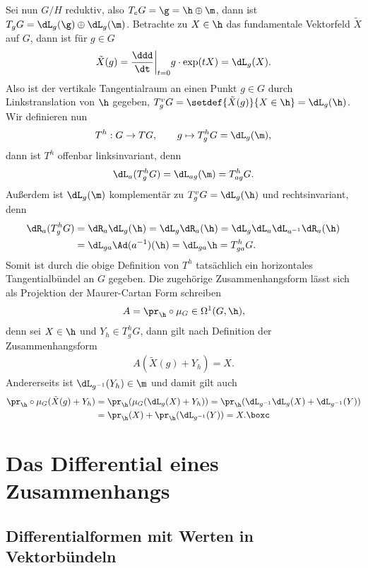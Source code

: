 \documentclass[%
	paper=a5,%
	fleqn,%
	DIV=18,%
	BCOR=0mm,
	fontsize=11pt,
	titlepage=false,%
	bibliography=totoc,
	DIV=18,%
	twoside=true,
	pdftitle=Riemannsche Geometrie,
	pdfauthor=Uwe Semmelmann,
	numbers=noendperiod]%
	{scrbook}
\begin{document}
\begin{ex}
Sei nun $G/H$ reduktiv, also $T_eG = \g = \h\oplus \m$, dann ist $T_gG =
\dL_g(\g)\oplus \dL_g(\m)$.
Betrachte zu $X\in\h$ das fundamentale Vektorfeld $\tilde{X}$ auf $G$, dann ist
für $g\in G$
\begin{align*}
\tilde{X}(g) = \frac{\ddd}{\dt}\bigg|_{t=0} g\cdot \exp(tX)
= \dL_g(X).
\end{align*}
Also ist der vertikale Tangentialraum an einen Punkt $g\in G$ durch
Linkstranslation von $\h$ gegeben, $T^v_g G = \setdef{\tilde{X}(g)}{X\in \h} =
\dL_g(\h)$. Wir definieren nun
\begin{align*}
T^h : G\to TG,\qquad g\mapsto T_g^hG = \dL_g(\m), 
\end{align*}
dann ist $T^h$ offenbar linksinvariant, denn
\begin{align*}
\dL_a(T^h_gG) = \dL_{ag}(\m) = T_{ag}^hG.
\end{align*}
Außerdem ist $\dL_g(\m)$ komplementär zu $T_g^vG = \dL_g(\h)$ und
rechtsinvariant, denn
\begin{align*}
\dR_a(T_g^hG) &= \dR_a\dL_g(\h) = 
\dL_g\dR_a(\h) = 
\dL_g\dL_a \dL_{a^{-1}}\dR_a(\h)\\
&= \dL_{ga}\Ad(a^{-1})(\h)
=   \dL_{ga}\h = T_{ga}^h G.
\end{align*}
Somit ist durch die obige Definition von $T^h$ tatsächlich ein horizontales
Tangentialbündel an $G$ gegeben. Die zugehörige Zusammenhangsform lässt sich als
Projektion der Maurer-Cartan Form schreiben
\begin{align*}
A = \pr_{\h}\circ\mu_G \in\Omega^1(G,\h),
\end{align*} 
denn sei $X\in\h$ und $Y_h\in T_g^h G$, dann gilt nach Definition der
Zusammenhangsform
\begin{align*}
A(\tilde{X}(g) + Y_h) = X.
\end{align*}
Andererseits ist $\dL_{g^{-1}}(Y_h) \in \m$ und damit gilt auch
\begin{align*}
\pr_{\h}\circ \mu_G(\tilde{X}(g) + Y_h) &= 
\pr_{\h}(\mu_G(\dL_g(X)+Y_h))
= \pr_{\h}(\dL_{g^{-1}}\dL_g(X) + \dL_{g^{-1}}(Y))\\
&= \pr_{\h}(X) + \pr_{\h}(\dL_{g^{-1}}(Y))
= X.\boxc
\end{align*}
\end{ex}

\chapter{Das Differential eines Zusammenhangs}

\section{Differentialformen mit Werten in Vektorbündeln}
\end{document}
